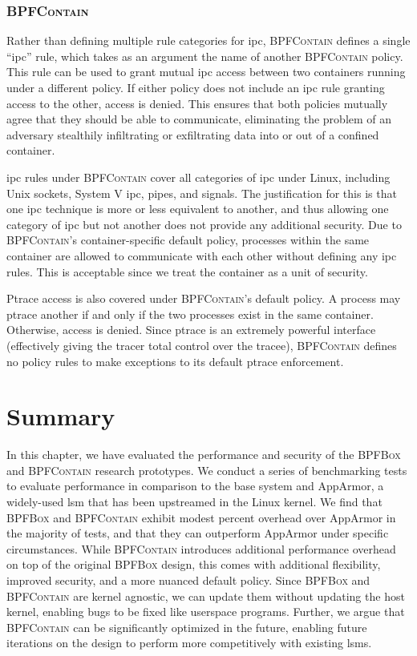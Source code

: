 \documentclass[
  fontsize=12pt,
  titlepage=firstiscover,
  paper=letter,
oneside,
  cleardoublepage=plain,
  parskip=half-,
  DIV=10,
  parindent,
  appendixprefix,
  chapterprefix,
  listof=totoc,
]{scrbook}
\newcommand{\bpfbox}{\textsc{BPFBox}}
\newcommand{\bpfcontain}{\textsc{BPFContain}}
\begin{document}
\subsubsection{\bpfcontain{}}

Rather than defining multiple rule categories for \gls{ipc}, \bpfcontain{} defines
a single \enquote{\gls{ipc}} rule, which takes as an argument the name of another
\bpfcontain{} policy. This rule can be used to grant mutual \gls{ipc} access between two
containers running under a different policy. If either policy does not include an
\gls{ipc} rule granting access to the other, access is denied. This ensures that both
policies mutually agree that they should be able to communicate, eliminating the problem
of an adversary stealthily infiltrating or exfiltrating data into or out of a confined
container.

\gls{ipc} rules under \bpfcontain{} cover all categories of \gls{ipc} under Linux,
including Unix sockets, System V \gls{ipc}, pipes, and signals. The justification for this
is that one \gls{ipc} technique is more or less equivalent to another, and thus allowing
one category of \gls{ipc} but not another does not provide any additional security. Due to
\bpfcontain{}'s container-specific default policy, processes within the same container are
allowed to communicate with each other without defining any \gls{ipc} rules. This is
acceptable since we treat the container as a unit of security.

Ptrace access is also covered under \bpfcontain{}'s default policy. A process may ptrace
another if and only if the two processes exist in the same container. Otherwise, access is
denied. Since ptrace is an extremely powerful interface (effectively giving the tracer
total control over the tracee), \bpfcontain{} defines no policy rules to make exceptions
to its default ptrace enforcement.


\section{Summary}\label{s:eval-summary}

In this chapter, we have evaluated the performance and security of the \bpfbox{} and
\bpfcontain{} research prototypes. We conduct a series of benchmarking tests to evaluate
performance in comparison to the base system and AppArmor, a widely-used \gls{lsm} that
has been upstreamed in the Linux kernel. We find that \bpfbox{} and \bpfcontain{} exhibit
modest percent overhead over AppArmor in the majority of tests, and that they can
outperform AppArmor under specific circumstances. While \bpfcontain{} introduces
additional performance overhead on top of the original \bpfbox{} design, this comes with
additional flexibility, improved security, and a more nuanced default policy. Since
\bpfbox{} and \bpfcontain{} are kernel agnostic, we can update them without updating the
host kernel, enabling bugs to be fixed like userspace programs. Further, we argue that
\bpfcontain{} can be significantly optimized in the future, enabling future iterations on
the design to perform more competitively with existing \glspl{lsm}.
\end{document}

